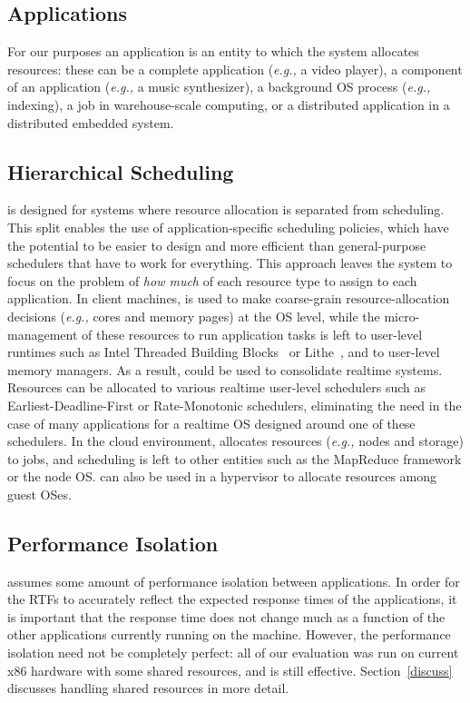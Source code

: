 \subsection{Applications}
For our purposes an application is an entity to which the system
allocates resources: these can be a complete application (\emph{e.g.,}
a video player), a component of an application (\emph{e.g.,} a music
synthesizer), a background OS process (\emph{e.g.,} indexing), a job
in warehouse-scale computing, or a distributed application in a
distributed embedded system.

\subsection{Hierarchical Scheduling}
\pacora is designed for systems where resource allocation is separated
from scheduling.  This split enables the use of application-specific
scheduling policies, which have the potential to be easier to design
and more efficient than general-purpose schedulers that have to work
for everything.  This approach leaves the system to focus on the
problem of \emph{how much} of each resource type to assign to each
application.  In client machines, \pacora is used to make coarse-grain
resource-allocation decisions (\emph{e.g.,} cores and memory pages) at
the OS level, while the micro-management of these resources to run
application tasks is left to user-level runtimes such as Intel
Threaded Building Blocks~\cite{CoMa08} or Lithe~\cite{lithe}, and to
user-level memory managers.
As a result, \pacora could be used to consolidate realtime systems.  Resources can be allocated to various realtime user-level schedulers such as Earliest-Deadline-First or Rate-Monotonic schedulers, eliminating the need in the case of many applications for a realtime OS designed around one of these schedulers.
In the cloud environment, \pacora allocates
resources (\emph{e.g.,} nodes and storage) to jobs, and scheduling is
left to other entities such as the MapReduce framework\cite{mapreduce}
or the node OS.  \pacora can also be used in a hypervisor to allocate
resources among guest OSes.

\subsection{Performance Isolation}
\pacora assumes some amount of performance isolation between
applications.  In order for the RTFs to accurately reflect the
expected response times of the applications, it is important that the
response time does not change much as a function of the other
applications currently running on the machine.  However, the
performance isolation need not be completely perfect: all of our
evaluation was run on current x86 hardware with some shared resources,
and \pacora is still effective. Section~\ref{discuss} discusses
handling shared resources in more detail.

